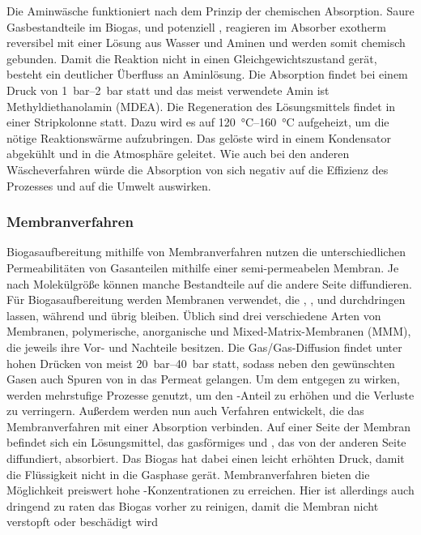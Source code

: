 Die Aminwäsche funktioniert nach dem Prinzip der chemischen Absorption. Saure Gasbestandteile im Biogas,  und potenziell , reagieren im Absorber exotherm reversibel mit einer Lösung aus Wasser und Aminen und werden somit chemisch gebunden. Damit die Reaktion nicht in einen Gleichgewichtszustand gerät, besteht ein deutlicher Überfluss an Aminlösung. Die Absorption findet bei einem Druck von \SIrange{1}{2}{\bar} statt und das meist verwendete Amin ist Methyldiethanolamin (MDEA). Die Regeneration des Lösungsmittels findet in einer Stripkolonne statt. Dazu wird es auf \SIrange{120}{160}{\degreeCelsius} aufgeheizt, um die nötige Reaktionswärme aufzubringen. Das gelöste  wird in einem Kondensator abgekühlt und in die Atmosphäre geleitet. Wie auch bei den anderen Wäscheverfahren würde die Absorption von  sich negativ auf die Effizienz des Prozesses und auf die Umwelt auswirken. \parencite{BHPT13} \parencite{KGKK2019}


\subsubsection{Membranverfahren}\label{chap:membrane} 

Biogasaufbereitung mithilfe von Membranverfahren nutzen die unterschiedlichen Permeabilitäten von Gasanteilen mithilfe einer semi-permeabelen Membran. Je nach Molekülgröße können manche Bestandteile auf die andere Seite diffundieren. Für Biogasaufbereitung werden Membranen verwendet, die , ,  und  durchdringen lassen, während  und  übrig bleiben. Üblich sind drei verschiedene Arten von Membranen, polymerische, anorganische und Mixed-Matrix-Membranen (MMM), die jeweils ihre Vor- und Nachteile besitzen. Die Gas/Gas-Diffusion findet unter hohen Drücken von meist \SIrange{20}{40}{\bar} statt, sodass neben den gewünschten Gasen auch Spuren von  in das Permeat gelangen. Um dem entgegen zu wirken, werden mehrstufige Prozesse genutzt, um den -Anteil zu erhöhen und die Verluste zu verringern. Außerdem werden nun auch Verfahren entwickelt, die das Membranverfahren mit einer Absorption verbinden. Auf einer Seite der Membran befindet sich ein Lösungsmittel, das gasförmiges  und , das von der anderen Seite diffundiert, absorbiert. Das Biogas hat dabei einen leicht erhöhten Druck, damit die Flüssigkeit nicht in die Gasphase gerät. Membranverfahren bieten die Möglichkeit preiswert hohe -Konzentrationen zu erreichen. Hier ist allerdings auch dringend zu raten das Biogas vorher zu reinigen, damit die Membran nicht verstopft oder beschädigt wird     \parencite{KGKK2019}


